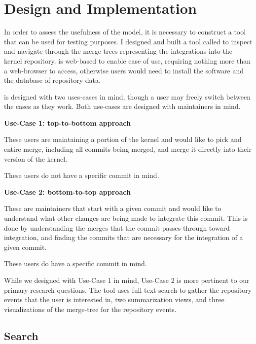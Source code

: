 \chapter{Design and Implementation}\label{cha:design_and_implementation}

In order to assess the usefulness of the model, it is necessary to
construct a tool that can be used for testing purposes. I designed and
built a tool called \tool{} to inspect and navigate through the
merge-trees representing the integrations into the kernel repository.
\tool{} is web-based to enable ease of use, requiring nothing more than
a web-browser to access, otherwise users would need to install the
software and the database of repository data.

\tool{} is designed with two uses-cases in mind, though a user may
freely switch between the cases as they work. Both use-cases are
designed with maintainers in mind.

\begin{textbox}
  \textbf{Use-Case 1: top-to-bottom approach}

  These users are maintaining a portion of the kernel and would like to
  pick and entire merge, including all commits being merged, and merge
  it directly into their version of the kernel.

  These users do not have a specific commit in mind.
\end{textbox}

\begin{textbox}
  \textbf{Use-Case 2: bottom-to-top approach}

  These are maintainers that start with a given commit and would like to
  understand what other changes are being made to integrate this commit.
  This is done by understanding the merges that the commit passes
  through toward integration, and finding the commits that are necessary
  for the integration of a given commit.

  These users do have a specific commit in mind.
\end{textbox}

While we designed \tool{} with Use-Case 1 in mind, Use-Case 2 is more
pertinent to our primary research questions. The tool uses full-text
search to gather the repository events that the user is interested in,
two summarization views, and three visualizations of the merge-tree for
the repository events.

\section{Search}\label{sec:search}

